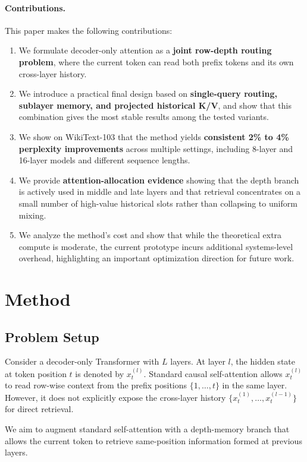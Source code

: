 \documentclass[11pt]{article}
\begin{document}
\paragraph{Contributions.}
This paper makes the following contributions:
\begin{enumerate}[leftmargin=1.5em]
    \item We formulate decoder-only attention as a \textbf{joint row-depth routing problem}, where the current token can read both prefix tokens and its own cross-layer history.
    \item We introduce a practical final design based on \textbf{single-query routing, sublayer memory, and projected historical K/V}, and show that this combination gives the most stable results among the tested variants.
    \item We show on WikiText-103 that the method yields \textbf{consistent 2\% to 4\% perplexity improvements} across multiple settings, including 8-layer and 16-layer models and different sequence lengths.
    \item We provide \textbf{attention-allocation evidence} showing that the depth branch is actively used in middle and late layers and that retrieval concentrates on a small number of high-value historical slots rather than collapsing to uniform mixing.
    \item We analyze the method's cost and show that while the theoretical extra compute is moderate, the current prototype incurs additional systems-level overhead, highlighting an important optimization direction for future work.
\end{enumerate}

\section{Method}

\subsection{Problem Setup}

Consider a decoder-only Transformer with $L$ layers. At layer $l$, the hidden state at token position $t$ is denoted by $x_t^{(l)}$. Standard causal self-attention allows $x_t^{(l)}$ to read row-wise context from the prefix positions $\{1, \dots, t\}$ in the same layer. However, it does not explicitly expose the cross-layer history $\{x_t^{(1)}, \dots, x_t^{(l-1)}\}$ for direct retrieval.

We aim to augment standard self-attention with a depth-memory branch that allows the current token to retrieve same-position information formed at previous layers.
\end{document}
